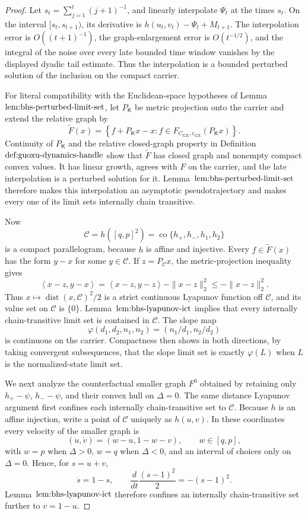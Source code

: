 \documentclass{article}
\begin{document}
\begin{proof}
Let \(s_t=\sum_{j=1}^t(j+1)^{-1}\), and linearly interpolate \(\Psi_t\) at the times \(s_t\).  On the interval \([s_t,s_{t+1})\), its derivative is \(h(u_t,v_t)-\Psi_t+M_{t+1}\).  The interpolation error is \(O((t+1)^{-1})\), the graph-enlargement error is \(O(t^{-1/2})\), and the integral of the noise over every late bounded time window vanishes by the displayed dyadic tail estimate.  Thus the interpolation is a bounded perturbed solution of the inclusion on the compact carrier.

For literal compatibility with the Euclidean-space hypotheses of Lemma~\(\textnormal{lem:bhs-perturbed-limit-set}\), let \(P_{\mathsf K}\) be metric projection onto the carrier and extend the relative graph by
\[
 \widetilde F(x)=
 \left\{f+P_{\mathsf K}x-x:f\in
 F_{C_{\mathrm{GX}},c_{\mathrm{GX}}}(P_{\mathsf K}x)\right\}.
\]
Continuity of \(P_{\mathsf K}\) and the relative closed-graph property in Definition~\(\textnormal{def:guoxu-dynamics-handle}\) show that \(\widetilde F\) has closed graph and nonempty compact convex values.  It has linear growth, agrees with \(F\) on the carrier, and the late interpolation is a perturbed solution for it.  Lemma~\(\textnormal{lem:bhs-perturbed-limit-set}\) therefore makes this interpolation an asymptotic pseudotrajectory and makes every one of its limit sets internally chain transitive.

Now
\[
 \mathcal C=h([q,p]^2)
 =\operatorname{co}\{h_+,h_-,h_1,h_2\}
\]
is a compact parallelogram, because \(h\) is affine and injective.  Every \(f\in\widetilde F(x)\) has the form \(y-x\) for some \(y\in\mathcal C\).  If \(z=P_{\mathcal C}x\), the metric-projection inequality gives
\[
 \left\langle x-z,y-x\right\rangle
 =\left\langle x-z,y-z\right\rangle-\|x-z\|_2^2
 \le-\|x-z\|_2^2.
\]
Thus \(x\mapsto\operatorname{dist}(x,\mathcal C)^2/2\) is a strict continuous Lyapunov function off \(\mathcal C\), and its value set on \(\mathcal C\) is \(\{0\}\).  Lemma~\(\textnormal{lem:bhs-lyapunov-ict}\) implies that every internally chain-transitive limit set is contained in \(\mathcal C\).  The slope map
\[
 \varphi(d_1,d_2,n_1,n_2)=(n_1/d_1,n_2/d_2)
\]
is continuous on the carrier.  Compactness then shows in both directions, by taking convergent subsequences, that the slope limit set is exactly \(\varphi(L)\) when \(L\) is the normalized-state limit set.

We next analyze the counterfactual smaller graph \(F^0\) obtained by retaining only \(h_+-\psi\), \(h_--\psi\), and their convex hull on \(\Delta=0\).  The same distance Lyapunov argument first confines each internally chain-transitive set to \(\mathcal C\).  Because \(h\) is an affine injection, write a point of \(\mathcal C\) uniquely as \(h(u,v)\).  In these coordinates every velocity of the smaller graph is
\[
 (\dot u,\dot v)=(w-u,1-w-v),\qquad w\in[q,p],
\]
with \(w=p\) when \(\Delta>0\), \(w=q\) when \(\Delta<0\), and an interval of choices only on \(\Delta=0\).  Hence, for \(s=u+v\),
\[
 \dot s=1-s,
 \qquad
 \frac{d}{dt}\frac{(s-1)^2}{2}=-(s-1)^2.
\]
Lemma~\(\textnormal{lem:bhs-lyapunov-ict}\) therefore confines an internally chain-transitive set further to \(v=1-u\).


\end{proof}
\end{document}

